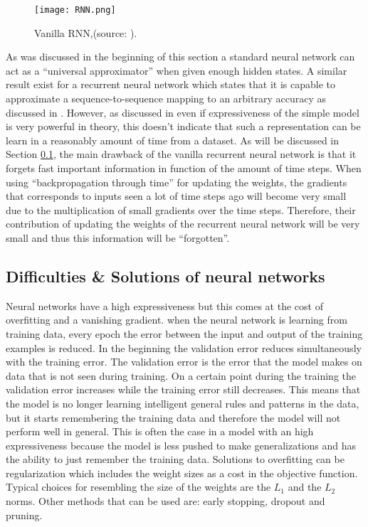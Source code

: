 \begin{figure}[h]
	\centering
	\texttt{[image: RNN.png]}
	\caption{Vanilla RNN,(source: \cite{Czum2020}).}
	\label{fig:RNN}
\end{figure}

As was discussed in the beginning of this section a standard neural network can act as a ``universal approximator'' when given enough hidden states. A similar result exist for a recurrent neural network which states that it is capable to approximate a sequence-to-sequence mapping to an arbitrary accuracy as discussed in \cite{Hammer2000}. However, as discussed in \cite{Teuwen2019} even if expressiveness of the simple model is very powerful in theory, this doesn't indicate that such a representation can be learn in a reasonably amount of time from a dataset. As will be discussed in Section \ref{s:Problems}, the main drawback of the vanilla recurrent neural network is that it forgets fast important information in function of the amount of time steps. When using ``backpropagation through time'' for updating the weights, the gradients that corresponds to inputs seen a lot of time steps ago will become very small due to the multiplication of small gradients over the time steps. Therefore, their contribution of updating the weights of the recurrent neural network will be very small and thus this information will be ``forgotten''.


\subsection{Difficulties \& Solutions of neural networks}\label{s:Problems}
Neural networks have a high expressiveness but this comes at the cost of overfitting and a vanishing gradient.
when the neural network is learning from training data, every epoch the error between the input and output of the training examples is reduced. In the beginning the validation error reduces simultaneously with the training error. The validation error is the error that the model makes on data that is not seen during training. On a certain point during the training the validation error increases while the training error still decreases. This means that the model is no longer learning intelligent general rules and patterns in the data, but it starts remembering the training data and therefore the model will not perform well in general. This is often the case in a model with an high expressiveness because the model is less pushed to make generalizations and has the ability to just remember the training data. Solutions to overfitting can be regularization which includes the weight sizes as a cost in the objective function. Typical choices for resembling the size of the weights are the $ L_1 $ and the $ L_2 $ norms. Other methods that can be used are: early stopping, dropout and pruning.

